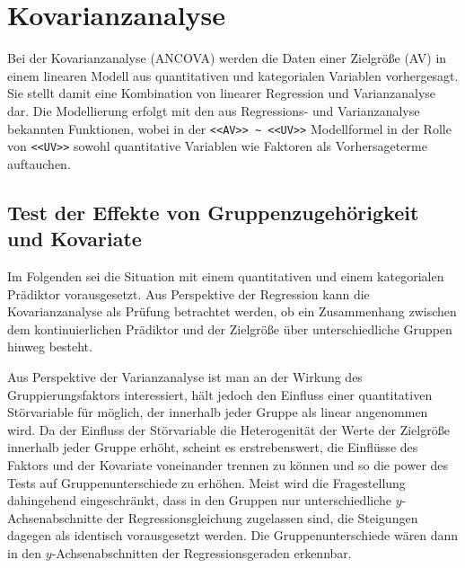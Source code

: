 \section{Kovarianzanalyse}
\label{sec:ancova}

Bei der Kovarianzanalyse (ANCOVA) werden die Daten einer Zielgröße (AV) in einem linearen Modell aus quantitativen und kategorialen Variablen vorhergesagt. Sie stellt damit eine Kombination von linearer Regression und Varianzanalyse dar. Die Modellierung erfolgt mit den aus Regressions- und Varianzanalyse bekannten Funktionen, wobei in der \lstinline!<<AV>> ~ <<UV>>! Modellformel in der Rolle von \lstinline!<<UV>>! sowohl quantitative Variablen wie Faktoren als Vorhersageterme auftauchen.

\subsection{Test der Effekte von Gruppenzugehörigkeit und Kovariate}
\label{sec:ancovaTest}

Im Folgenden sei die Situation mit einem quantitativen und einem kategorialen Prädiktor vorausgesetzt. Aus Perspektive der Regression kann die Kovarianzanalyse als Prüfung betrachtet werden, ob ein Zusammenhang zwischen dem kontinuierlichen Prädiktor und der Zielgröße über unterschiedliche Gruppen hinweg besteht.

Aus Perspektive der Varianzanalyse ist man an der Wirkung des Gruppierungsfaktors interessiert, hält jedoch den Einfluss einer quantitativen Störvariable für möglich, der innerhalb jeder Gruppe als linear angenommen wird. Da der Einfluss der Störvariable die Heterogenität der Werte der Zielgröße innerhalb jeder Gruppe erhöht, scheint es erstrebenswert, die Einflüsse des Faktors und der Kovariate voneinander trennen zu können und so die power des Tests auf Gruppenunterschiede zu erhöhen. Meist wird die Fragestellung dahingehend eingeschränkt, dass in den Gruppen nur unterschiedliche $y$-Achsenabschnitte der Regressionsgleichung zugelassen sind, die Steigungen dagegen als identisch vorausgesetzt werden. Die Gruppenunterschiede wären dann in den $y$-Achsenabschnitten der Regressionsgeraden erkennbar.

